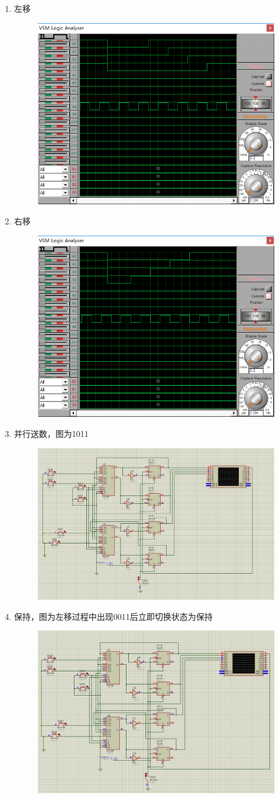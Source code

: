 \documentclass[11pt,UTF8]{ctexart}
\begin{document}
\begin{enumerate}
\item 左移
\begin{figure}[H]
    \centering
    \includegraphics[width=0.6\linewidth]{fig/ls.PNG}
\end{figure}
\item 右移
\begin{figure}[H]
    \centering
    \includegraphics[width=0.6\linewidth]{fig/rs.PNG}
\end{figure}
\item 并行送数，图为1011
\begin{figure}[H]
    \centering
    \includegraphics[width=0.6\linewidth]{fig/parallel.PNG}
\end{figure}
\item 保持，图为左移过程中出现0011后立即切换状态为保持
\begin{figure}[H]
    \centering
    \includegraphics[width=0.6\linewidth]{fig/hold.PNG}
\end{figure}
\end{enumerate}
\end{document}

